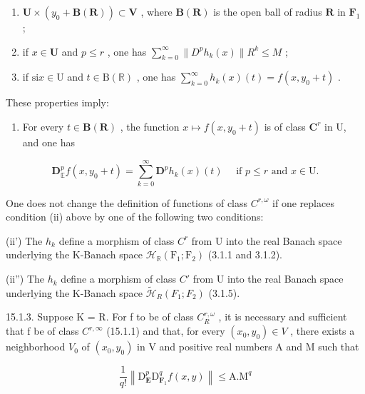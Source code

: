 \begin{enumerate}
\def\labelenumi{(\roman{enumi})}
\item
  \(\mathbf{U} \times (y_0 + \mathbf{B}(\mathbf{R})) \subset \mathbf{V}\) , where \(\mathbf{B}(\mathbf{R})\) is the open ball of radius \(\mathbf{R}\) in \(\mathbf{F}_1\) ;
\item
  if \(x \in \mathbf{U}\) and \(p \leqslant r\) , one has \(\sum_{k=0}^{\infty} \| D^p h_k(x) \| R^k \leqslant M\) ;
\item
  if \(\mathrm{si} x \in \mathrm{U}\) and \(t \in \mathrm{B}(\mathbb{R})\) , one has \(\sum_{k=0}^{\infty} h_k(x)(t) = f(x, y_0 + t)\) .
\end{enumerate}

These properties imply:

\begin{enumerate}
\def\labelenumi{(\roman{enumi})}
\setcounter{enumi}{3}
\tightlist
\item
  For every \(t \in \mathbf{B}(\mathbf{R})\) , the function \(x \mapsto f(x, y_0 + t)\) is of class \(\mathbf{C}^{r}\) in U, and one has
\end{enumerate}

\[
\mathbf {D} _ {\mathbb {E}} ^ {p} f (x, y _ {0} + t) = \sum_ {k = 0} ^ {\infty} \mathbf {D} ^ {p} h _ {k} (x) (t) \quad \text { if } p \leqslant r \text { and } x \in \mathrm{U}.\tag{2}
\]

One does not change the definition of functions of class \(C^{r,\omega}\) if one replaces condition (ii) above by one of the following two conditions:

(ii') The \(h_k\) define a morphism of class \(C^r\) from U into the real Banach space underlying the K-Banach space \(\mathcal{H}_{\mathbb{R}}(\mathrm{F}_1; \mathrm{F}_2)\) (3.1.1 and 3.1.2).

(ii'') The \(h_k\) define a morphism of class \(C'\) from U into the real Banach space underlying the K-Banach space \(\tilde{\mathcal{H}}_R(F_1; F_2)\) (3.1.5).

15.1.3. Suppose K = R. For f to be of class \(C_{R}^{r,\omega}\) , it is necessary and sufficient that f be of class \(C^{r,\infty}\) (15.1.1) and that, for every \((x_{0}, y_{0}) \in V\) , there exists a neighborhood \(V_{0}\) of \((x_{0}, y_{0})\) in V and positive real numbers A and M such that

\[
\frac {1}{q !} \left\| \mathrm{D} _ {\mathbf {E}} ^ {p} \mathrm{D} _ {\mathbf {F} _ {1}} ^ {q} f (x, y) \right\| \leqslant \mathrm{A}. \mathrm{M} ^ {q}\tag{3}
\]

